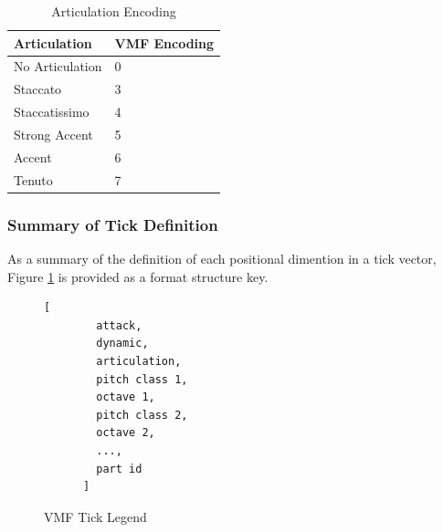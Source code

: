\begin{table}[ht]
  \centering
  \begin{tabular}{ll}
  Articulation & VMF Encoding \\ \hline
  No Articulation      & 0 \\
  Staccato             & 3 \\
  Staccatissimo        & 4 \\
  Strong Accent        & 5 \\
  Accent               & 6 \\
  Tenuto               & 7 \\
  \end{tabular}
  \caption{Articulation Encoding}
  \label{tab:articulationsMapping}
\end{table}

\subsubsection{Summary of Tick Definition}

As a summary of the definition of each positional dimention in a tick vector, Figure \ref{fig:vectorReference} is provided as a format structure key.

\begin{figure}
  \begin{center}
    \begin{Verbatim}[fontfamily=courier, xleftmargin=\parindent]
      [
        attack,
        dynamic,
        articulation, 
        pitch class 1, 
        octave 1, 
        pitch class 2, 
        octave 2, 
        ..., 
        part id
      ]
    \end{Verbatim}
    \caption{VMF Tick Legend}
    \label{fig:vectorReference}
  \end{center}
\end{figure}